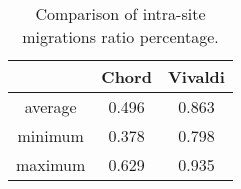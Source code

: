 \begin{table}

  \begin{center}
    \begin{tabular}{|c|c|c|}   

      \hline \multicolumn{1}{|p{3cm}|}{ }
       & \multicolumn{1}{|p{3cm}|}{\centering Chord }  & \multicolumn{1}{|p{3cm}|}{ \centering Vivaldi}  \\

      \hline
      average & 0.496 & 0.863 \\

      \hline
      minimum & 0.378 & 0.798 \\

      \hline
      maximum & 0.629 & 0.935 \\

      \hline
    \end{tabular}
  \end{center}
  \caption{Comparison of intra-site migrations ratio percentage.}
\end{table}
